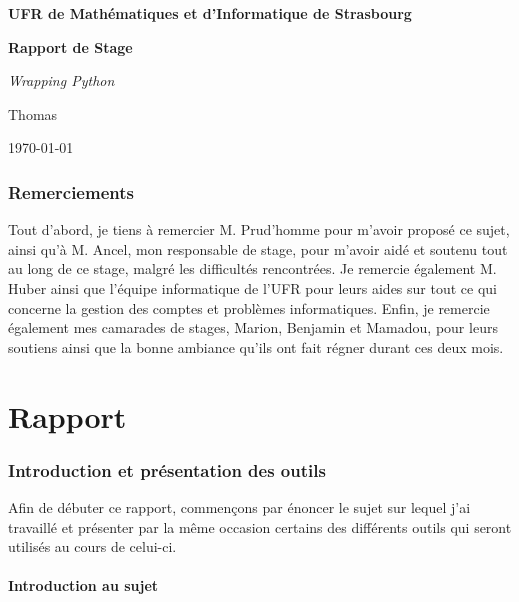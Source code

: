 \documentclass[french,12pt]{article}
\author{Thomas \bsc{Lantz}}
\begin{document}
\begin{titlepage}
\begin{center}
  \Huge
  \textbf{UFR de Mathématiques et d'Informatique de Strasbourg}
  \par \vspace{2 cm}
  \textbf{Rapport de Stage}
  \par \vspace{1 cm}
  \emph{Wrapping Python}
  \par \vspace{5 cm}
   Thomas
  \par \vspace{2 cm}
  \par \vspace{3 cm}
  \normalsize{\today}\\
  \end{center}
\end{titlepage}

\newpage
\tableofcontents
\newpage

\section*{Remerciements}
Tout d'abord, je tiens à remercier M. Prud'homme pour m'avoir proposé ce sujet, ainsi qu'à M. Ancel, mon responsable de stage, pour m'avoir aidé et soutenu tout au long de ce stage, malgré les difficultés rencontrées. Je remercie également M. Huber ainsi que l'équipe informatique de l'UFR pour leurs aides sur tout ce qui concerne la gestion des comptes et problèmes informatiques. Enfin, je remercie également mes camarades de stages, Marion, Benjamin et Mamadou, pour leurs soutiens ainsi que la bonne ambiance qu'ils ont fait régner durant ces deux mois.

\newpage
\part{Rapport}
\section{Introduction et présentation des outils}

Afin de débuter ce rapport, commençons par énoncer le sujet sur lequel j'ai travaillé et présenter par la même occasion certains des différents outils qui seront utilisés au cours de celui-ci.

\subsection{Introduction au sujet}
\end{document}
